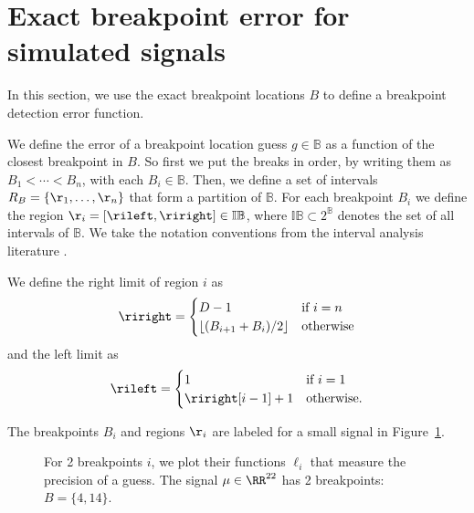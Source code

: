 \documentclass{article}
\begin{document}
\newpage

\section{Exact breakpoint error for simulated signals}
\label{sec:breakpoint_error}

In this section, we use the exact breakpoint locations $B$ to define a
breakpoint detection error function.

We define the error of a breakpoint location guess $g\in\mathbb
B$ as a function of the closest breakpoint in $B$. So
first we put the breaks in order, by writing them as $B_1<\cdots<
B_n$, with each $B_i\in\mathbb B$. Then, we define a set of intervals
$R_B=\{\r_1,\dots,\r_n\}$ that form a partition of $\mathbb B$. For each
breakpoint $B_i$ we define the region
${\r}_i=[\rileft,\riright]\in\mathbb I \mathbb B$, where $\mathbb
I\mathbb B\subset 2^{\mathbb B}$ denotes the set of all intervals of
$\mathbb B$. We take the notation conventions from the interval
analysis literature \citep{intervals}.

We define the right limit of region $i$ as
\begin{equation}
  \label{eq:R_i}
\riright
=
  \begin{cases}
    D-1 & \text{if } i=n \\
    \lfloor (B_{i+1}+B_i)/2 \rfloor & \text{otherwise}
  \end{cases}
\end{equation}
and
the left limit as
\begin{equation}
  \label{eq:L_i}
  \rileft =
  \begin{cases}
    1 & \text{if } i=1 \\
    \riright[i-1]+1 & \text{otherwise}.
  \end{cases}
\end{equation}

The breakpoints $B_i$ and regions $\r_i$ are labeled for a small
signal in Figure~\ref{fig:exact_imprecision}.

\begin{figure}[b]
  \centering
  
  \caption{For 2 breakpoints $i$, we plot their functions $\ell_i$
    that measure the precision of a guess.
    The signal $\mu\in\RR^{22}$ has 2 breakpoints: $B=\{4,14\}$.}
  \label{fig:exact_imprecision}
\end{figure}
\end{document}
